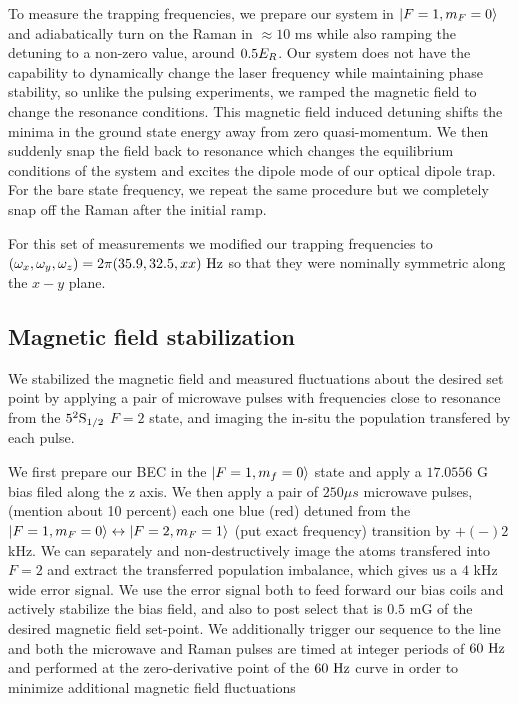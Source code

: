  To measure the trapping frequencies, we prepare our system in $|F=1,m_F=0\rangle$ and adiabatically turn on the Raman in $\approx10$ ms while also ramping the detuning to a non-zero value, around $0.5{{E_R}}$. Our system does not have the capability to dynamically change the laser frequency while maintaining phase stability, so unlike the pulsing experiments, we ramped the magnetic field to change the resonance conditions. This magnetic field induced detuning shifts the minima in the ground state energy away from zero quasi-momentum. We then suddenly snap the field back to resonance which changes the equilibrium conditions of the system and excites the dipole mode of our optical dipole trap. For the bare state frequency, we repeat the same procedure but we completely snap off the Raman after the initial ramp. 

For this set of measurements we modified our trapping frequencies to $(\omega_x, \omega_y, \omega_z)=2\pi(35.9, 32.5, xx) {\ {\rm Hz}}$  so that they were nominally symmetric along the $x-y$ plane. 

\subsection{Magnetic field stabilization}
We stabilized the magnetic field and measured fluctuations about the desired set point by applying a pair of microwave pulses with frequencies close to resonance from the $5^2{\rm S}_{1/2}$ $F=2$ state, and imaging the in-situ the population transfered by each pulse. 

We first prepare our BEC in the $|F=1, m_f=0\rangle$ state and apply a $17.0556$ G bias filed along the z axis. We then apply a pair of $250\mu s$ microwave pulses, (mention about 10 percent) each one blue (red) detuned from the $|F=1,m_F=0\rangle\leftrightarrow|F=2,m_F=1\rangle $  (put exact frequency) transition by $+(-)2$ kHz. We can separately and non-destructively image the atoms transfered into $F=2$ and extract the transferred population imbalance, which gives us a $4$ kHz wide error signal. We use the error signal both to feed forward our bias coils and actively stabilize the bias field, and also to post select that is $0.5$ mG of the desired magnetic field set-point. We additionally trigger our sequence to the line and both the microwave and Raman pulses are timed at integer periods of $60{\ {\rm Hz}}$ and performed at the zero-derivative point of the $60{\ {\rm Hz}}$ curve in order to minimize additional magnetic field fluctuations


